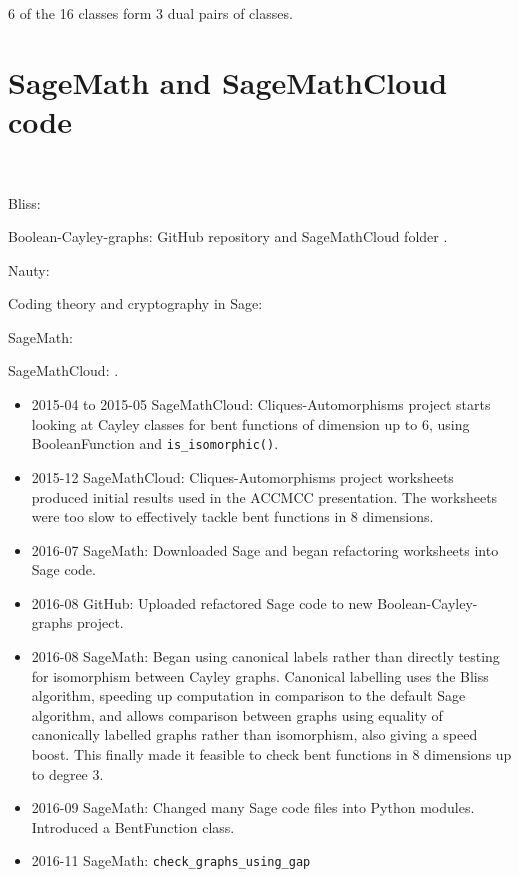 \documentclass[12pt,a4paper]{article}
\begin{document}
6 of the 16 classes form 3 dual pairs of classes.

\section{SageMath and SageMathCloud code}
\label{sec-Code}
~

Bliss: \cite{JunK07Bliss,JukN11conflict}

Boolean-Cayley-graphs: GitHub repository \cite{Leo16GitHub} and SageMathCloud folder
\cite{Leo16SMC}.

Nauty: \cite{McKP13nauty,McKP14practical}

Coding theory and cryptography in Sage: \cite{JoyEtAl13Sage}

SageMath: \cite{SageMath7517}

SageMathCloud: \cite{SageMathCloud}.


\begin{itemize}
 \item 2015-04 to 2015-05 SageMathCloud: Cliques-Automorphisms project starts looking at Cayley
classes for bent functions of dimension up to 6, using BooleanFunction and \verb!is_isomorphic()!.
 \item 2015-12 SageMathCloud: Cliques-Automorphisms project
worksheets produced initial results used in the ACCMCC presentation.
The worksheets were too slow to effectively tackle bent functions in 8 dimensions.
 \item 2016-07 SageMath: Downloaded Sage and began refactoring worksheets into Sage code.
 \item 2016-08 GitHub: Uploaded refactored Sage code to new Boolean-Cayley-graphs project.
 \item 2016-08 SageMath: Began using canonical labels rather than directly testing for isomorphism
between Cayley graphs.
Canonical labelling uses the Bliss algorithm, speeding up computation in comparison to the default
Sage algorithm,
and allows comparison between graphs using equality of canonically labelled graphs rather than
isomorphism, also giving a speed boost.
This finally made it feasible to check bent functions in 8 dimensions up to degree 3.
 \item 2016-09 SageMath: Changed many Sage code files into Python modules.
Introduced a BentFunction class.
 \item 2016-11 SageMath: \verb!check_graphs_using_gap!
\end{itemize}
\end{document}
